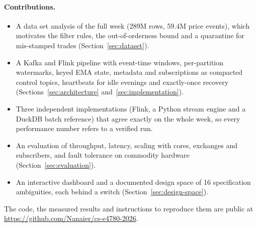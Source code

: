 \paragraph{Contributions.}
\begin{itemize}
  \item A data set analysis of the full week (289M rows, 59.4M price events), which motivates the filter rules, the out-of-orderness bound and a quarantine for mis-stamped trades (Section~\ref{sec:dataset}).
  \item A Kafka and Flink pipeline with event-time windows, per-partition watermarks, keyed EMA state, metadata and subscriptions as compacted control topics, heartbeats for idle evenings and exactly-once recovery (Sections~\ref{sec:architecture} and~\ref{sec:implementation}).
  \item Three independent implementations (Flink, a Python stream engine and a DuckDB batch reference) that agree exactly on the whole week, so every performance number refers to a verified run.
  \item An evaluation of throughput, latency, scaling with cores, exchanges and subscribers, and fault tolerance on commodity hardware (Section~\ref{sec:evaluation}).
  \item An interactive dashboard and a documented design space of 16 specification ambiguities, each behind a switch (Section~\ref{sec:design-space}).
\end{itemize}

The code, the measured results and instructions to reproduce them are public at \url{https://github.com/Nanaier/cs-e4780-2026}.

